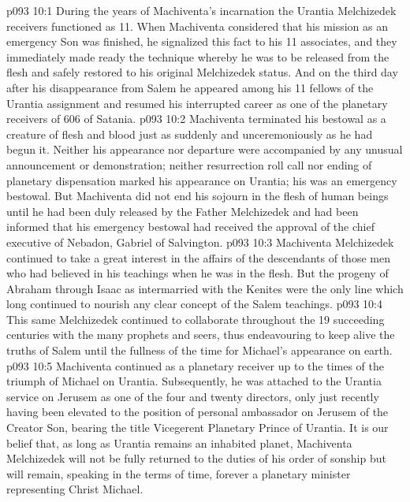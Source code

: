 \vs p093 10:1 During the years of Machiventa’s incarnation the Urantia Melchizedek receivers functioned as 11. When Machiventa considered that his mission as an emergency Son was finished, he signalized this fact to his 11 associates, and they immediately made ready the technique whereby he was to be released from the flesh and safely restored to his original Melchizedek status. And on the third day after his disappearance from Salem he appeared among his 11 fellows of the Urantia assignment and resumed his interrupted career as one of the planetary receivers of 606 of Satania.
\vs p093 10:2 Machiventa terminated his bestowal as a creature of flesh and blood just as suddenly and unceremoniously as he had begun it. Neither his appearance nor departure were accompanied by any unusual announcement or demonstration; neither resurrection roll call nor ending of planetary dispensation marked his appearance on Urantia; his was an emergency bestowal. But Machiventa did not end his sojourn in the flesh of human beings until he had been duly released by the Father Melchizedek and had been informed that his emergency bestowal had received the approval of the chief executive of Nebadon, Gabriel of Salvington.
\vs p093 10:3 \pc Machiventa Melchizedek continued to take a great interest in the affairs of the descendants of those men who had believed in his teachings when he was in the flesh. But the progeny of Abraham through Isaac as intermarried with the Kenites were the only line which long continued to nourish any clear concept of the Salem teachings.
\vs p093 10:4 This same Melchizedek continued to collaborate throughout the 19 succeeding centuries with the many prophets and seers, thus endeavouring to keep alive the truths of Salem until the fullness of the time for Michael’s appearance on earth.
\vs p093 10:5 Machiventa continued as a planetary receiver up to the times of the triumph of Michael on Urantia. Subsequently, he was attached to the Urantia service on Jerusem as one of the four and twenty directors, only just recently having been elevated to the position of personal ambassador on Jerusem of the Creator Son, bearing the title Vicegerent Planetary Prince of Urantia. It is our belief that, as long as Urantia remains an inhabited planet, Machiventa Melchizedek will not be fully returned to the duties of his order of sonship but will remain, speaking in the terms of time, forever a planetary minister representing Christ Michael.
